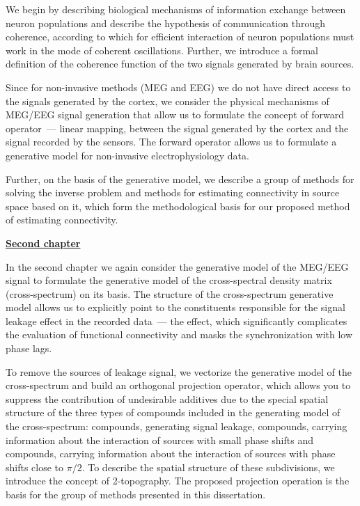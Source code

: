 We begin by describing biological mechanisms of information exchange between
neuron populations and describe the hypothesis of communication through
coherence, according to which for efficient interaction of neuron populations
must work in the mode of coherent oscillations. Further, we introduce a formal
definition of the coherence function of the two signals generated by brain
sources.

Since for non-invasive methods (MEG and EEG) we do not have direct access to
the signals generated by the cortex, we consider the physical mechanisms of
MEG/EEG signal generation that allow us to formulate the concept of forward
operator~--- linear mapping, between the signal generated by the cortex and the
signal recorded by the sensors. The forward operator allows us to formulate a
generative model for non-invasive electrophysiology data.

Further, on the basis of the generative model, we describe a group of methods
for solving the inverse problem and methods for estimating connectivity in
source space based on it, which form the methodological basis for our proposed
method of estimating connectivity.




\underline{\textbf{Second chapter}}

In the second chapter we again consider the generative model of the MEG/EEG
signal to formulate the generative model of the cross-spectral density matrix
(cross-spectrum) on its basis. The structure of the cross-spectrum generative
model allows us to explicitly point to the constituents responsible for the
signal leakage effect in the recorded data~--- the effect, which
significantly complicates the evaluation of functional connectivity and masks
the synchronization with low phase lags.


To remove the sources of leakage signal, we vectorize the generative model of
the cross-spectrum and build an orthogonal projection operator, which allows
you to suppress the contribution of undesirable additives due to the special
spatial structure of the three types of compounds included in the generating
model of the cross-spectrum: compounds, generating signal leakage, compounds,
carrying information about the interaction of sources with small phase shifts
and compounds, carrying information about the interaction of sources with phase
shifts close to $\pi/2$. To describe the spatial structure of these
subdivisions, we introduce the concept of 2-topography.  The proposed
projection operation is the basis for the group of methods presented in this
dissertation.

